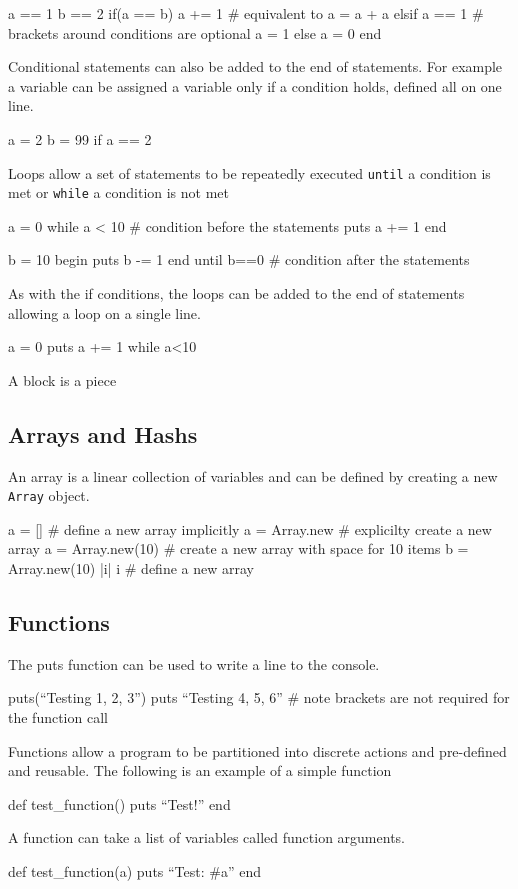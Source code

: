 a == 1
b == 2
if(a == b) 
	a += 1 # equivalent to a = a + a
elsif a == 1 # brackets around conditions are optional
	a = 1
else 
 	a = 0
end

Conditional statements can also be added to the end of statements. For example a variable can be assigned a variable only if a condition holds, defined all on one line.

a = 2
b = 99 if a == 2

Loops allow a set of statements to be repeatedly executed \texttt{until} a condition is met or \texttt{while} a condition is not met

a = 0
while a < 10 # condition before the statements
	puts a += 1
end

b = 10
begin 
	puts b -= 1
end until b==0 # condition after the statements

As with the if conditions, the loops can be added to the end of statements allowing a loop on a single line.

a = 0
puts a += 1 while a<10

A block is a piece 

\subsection{Arrays and Hashs}
An array is a linear collection of variables and can be defined by creating a new \texttt{Array} object.

a = [] # define a new array implicitly
a = Array.new # explicilty create a new array
a = Array.new(10) # create a new array with space for 10 items
b = Array.new(10) {|i| i} # define a new array

\subsection{Functions}
The puts function can be used to write a line to the console.

puts(``Testing 1, 2, 3'')
puts ``Testing 4, 5, 6'' # note brackets are not required for the function call

Functions allow a program to be partitioned into discrete actions and pre-defined and reusable. The following is an example of a simple function

def test_function()
	puts ``Test!''
end

A function can take a list of variables called function arguments.

def test_function(a)
	puts ``Test: #{a}''
end

